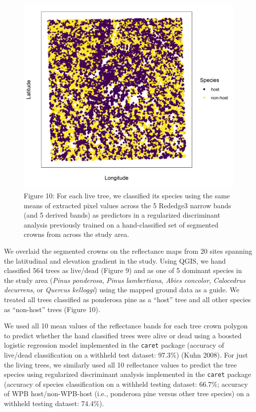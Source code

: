 \documentclass[]{article}
\begin{document}
\begin{figure}
\centering
\includegraphics{../../figures/eldo_3k_3_host_nonhost.png}
\caption{Figure 10: For each live tree, we classified its species using
the same means of extracted pixel values across the 5 Rededge3 narrow
bands (and 5 derived bands) as predictors in a regularized discriminant
analysis previously trained on a hand-classified set of segmented crowns
from across the study area.}
\end{figure}

We overlaid the segmented crowns on the reflectance maps from 20 sites
spanning the latitudinal and elevation gradient in the study. Using
QGIS, we hand classified 564 trees as live/dead (Figure 9) and as one of
5 dominant species in the study area (\emph{Pinus ponderosa},
\emph{Pinus lambertiana}, \emph{Abies concolor}, \emph{Calocedrus
decurrens}, or \emph{Quercus kelloggi}) using the mapped ground data as
a guide. We treated all trees classified as ponderosa pine as a ``host''
tree and all other species as ``non-host'' trees (Figure 10).

We used all 10 mean values of the reflectance bands for each tree crown
polygon to predict whether the hand classified trees were alive or dead
using a boosted logistic regression model implemented in the
\texttt{caret} package (accuracy of live/dead classification on a
withheld test dataset: 97.3\%) (Kuhn 2008). For just the living trees,
we similarly used all 10 reflectance values to predict the tree species
using regularized discriminant analysis implemented in the
\texttt{caret} package (accuracy of species classification on a withheld
testing dataset: 66.7\%; accuracy of WPB host/non-WPB-host (i.e.,
ponderosa pine versus other tree species) on a withheld testing dataset:
74.4\%).
\end{document}
